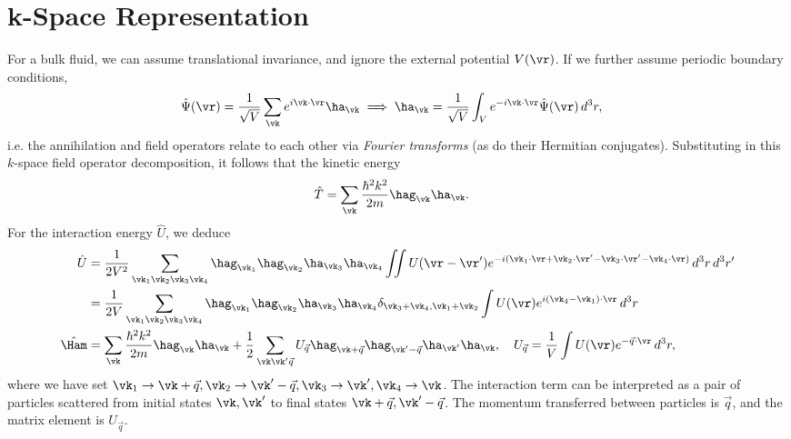 \documentclass[qo.tex]{subfiles}
\begin{document}
\section{k-Space Representation}
For a bulk fluid, we can assume translational invariance, and ignore the external potential $V(\vr)$.
If we further assume periodic boundary conditions, 
\begin{align}
    \hat{\Psi}(\vr) &= \frac{1}{\sqrt{V}}\sum_{\vk}e^{i\vk\cdot\vr}\ha_{\vk} \implies \ha_{\vk} = \frac{1}{\sqrt{V}} \int_V e^{-i\vk\cdot\vr}\hat{\Psi}(\vr)\,d^3r,
\end{align}
i.e. the annihilation and field operators relate to each other via \emph{Fourier transforms} (as do their Hermitian conjugates).
Substituting in this $k$-space field operator decomposition, it follows that the kinetic energy
\begin{align}
    \hat{T} &= \sum_{\vk} \frac{\hbar^2k^2}{2m}\hag_{\vk}\ha_{\vk}.
\end{align}
For the interaction energy $\hat{U}$, we deduce
\begin{align}
    \hat{U} &= \frac{1}{2V^2} \sum_{\vk_1\vk_2\vk_3\vk_4} \hag_{\vk_1}\hag_{\vk_2}\ha_{\vk_3}\ha_{\vk_4}\iint U(\vr-\vr')e^{-i(\vk_1\cdot\vr + \vk_2\cdot\vr' - \vk_3\cdot\vr' - \vk_4\cdot\vr)}\,d^3r\,d^3r'  \\ 
            &= \frac{1}{2V} \sum_{\vk_1\vk_2\vk_3\vk_4} \hag_{\vk_1}\hag_{\vk_2}\ha_{\vk_3}\ha_{\vk_4}\delta_{\vk_3+\vk_4,\vk_1+\vk_2} \int U(\vr)e^{i(\vk_4-\vk_1)\cdot\vr}\,d^3r \\
    \hat{\Ham} &= \sum_{\vk} \frac{\hbar^2k^2}{2m}\hag_{\vk}\ha_{\vk} + \frac12 \sum_{\vk\vk'\vec{q}} U_{\vec{q}}\hag_{\vk+\vec{q}}\hag_{\vk'-\vec{q}}\ha_{\vk'}\ha_{\vk}, \quad U_{\vec{q}} = \frac{1}{V}\int U(\vr)e^{-\vec{q}\cdot\vr}\,d^3r,
\end{align}
where we have set $\vk_1\to\vk+\vec{q}, \vk_2\to\vk'-\vec{q}, \vk_3\to\vk', \vk_4\to\vk$.
The interaction term can be interpreted as a pair of particles scattered from initial states $\vk,\vk'$ to final states $\vk+\vec{q},\vk'-\vec{q}$.
The momentum transferred between particles is $\vec{q}$, and the matrix element is $U_{\vec{q}}$.
\end{document}
